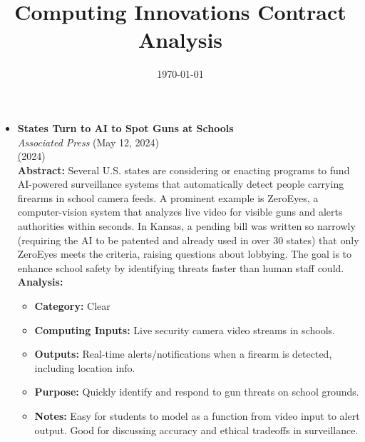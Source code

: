 \documentclass[11pt]{article}
\title{Computing Innovations Contract Analysis}
\author{}
\date{\today}
\begin{document}
\maketitle

\begin{itemize}
\item \textbf{States Turn to AI to Spot Guns at Schools} \\
\textit{Associated Press} (May 12, 2024)\\
\href{https://technews.acm.org/archives.cfm?fo=2024-05-may#15} (2024)\\
\textbf{Abstract:} Several U.S. states are considering or enacting programs to fund AI-powered surveillance systems that automatically detect people carrying firearms in school camera feeds. A prominent example is ZeroEyes, a computer-vision system that analyzes live video for visible guns and alerts authorities within seconds. In Kansas, a pending bill was written so narrowly (requiring the AI to be patented and already used in over 30 states) that only ZeroEyes meets the criteria, raising questions about lobbying. The goal is to enhance school safety by identifying threats faster than human staff could.\\
\textbf{Analysis:}\\
\begin{itemize}
\item \textbf{Category:} Clear
\item \textbf{Computing Inputs:} Live security camera video streams in schools.
\item \textbf{Outputs:} Real-time alerts/notifications when a firearm is detected, including location info.
\item \textbf{Purpose:} Quickly identify and respond to gun threats on school grounds.
\item \textbf{Notes:} Easy for students to model as a function from video input to alert output. Good for discussing accuracy and ethical tradeoffs in surveillance.
\end{itemize}


\end{itemize}
\end{document}
